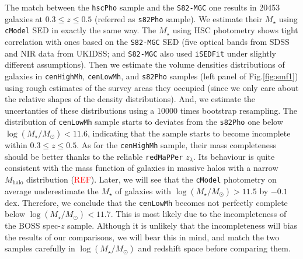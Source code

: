 \documentclass{emulateapj}
\def\redm{\texttt{redMaPPer}}
\def\cmodel{\texttt{cModel}}
\def\rbcg{\texttt{cenHighMh}}
\def\nbcg{\texttt{cenLowMh}}
\def\mstar{{$M_{\star}$}}
\def\mhalo{{$M_{\mathrm{halo}}$}}
\def\logms{{$\log (M_{\star}/M_{\odot})$}}
\newcommand{\addref}{{\textcolor{red}{REF}}}
\begin{document}
\begin{CJK*}{UTF8}{gbsn}
    The match between the \texttt{hscPho} sample and the \texttt{S82-MGC} one results in 
    20453 galaxies at $0.3 \leq z \leq 0.5$ (referred as \texttt{s82Pho} sample).  
    We estimate their \mstar{} using \texttt{cModel} SED in exactly the same way. 
    The \mstar{} using HSC photometry shows tight correlation with ones based on the
    \texttt{S82-MGC} SED (five optical bands from SDSS and NIR data from UKIDSS; and 
    \texttt{S82-MGC} also used \texttt{iSEDFit} under slightly different assumptions).  
    Then we estimate the volume densities distributions of galaxies in \rbcg{}, \nbcg{}, 
    and \texttt{s82Pho} samples (left panel of Fig.\ref{fig:smf1}) using rough estimates 
    of the survey areas they occupied (since we only care about the relative shapes of 
    the density distributions). 
    And, we estimate the uncertanties of these distributions using a 10000 times 
    bootstrap resampling. 
    The distribution of \nbcg{} sample starts to deviates from the \texttt{s82Pho} one 
    below \logms{}$< 11.6$, indicating that the sample starts to become incomplete within
    $0.3 \leq z \leq 0.5$. 
    As for the \rbcg{} sample, their mass completeness should be better thanks to the 
    reliable \redm{} $z_{\lambda}$. 
    Its behaviour is quite consistent with the mass function of galaxies in massive 
    halos with a narrow \mhalo{} distribution (\addref).   
    Later, we will see that the \cmodel{} photometry on average underestimate the 
    \mstar{} of galaxies with \logms{}$>11.5$ by $-0.1$ dex.
    Therefore, we conclude that the \nbcg{} becomes not perfectly complete below 
    \logms{}$< 11.7$.  
    This is most likely due to the incompleteness of the BOSS spec-$z$ sample. 
    Although it is unlikely that the incompleteness will bias the results of our 
    comparisons, we will bear this in mind, and match the two samples carefully in 
    \logms{} and redshift space before comparing them.



\end{CJK*}
\end{document}

